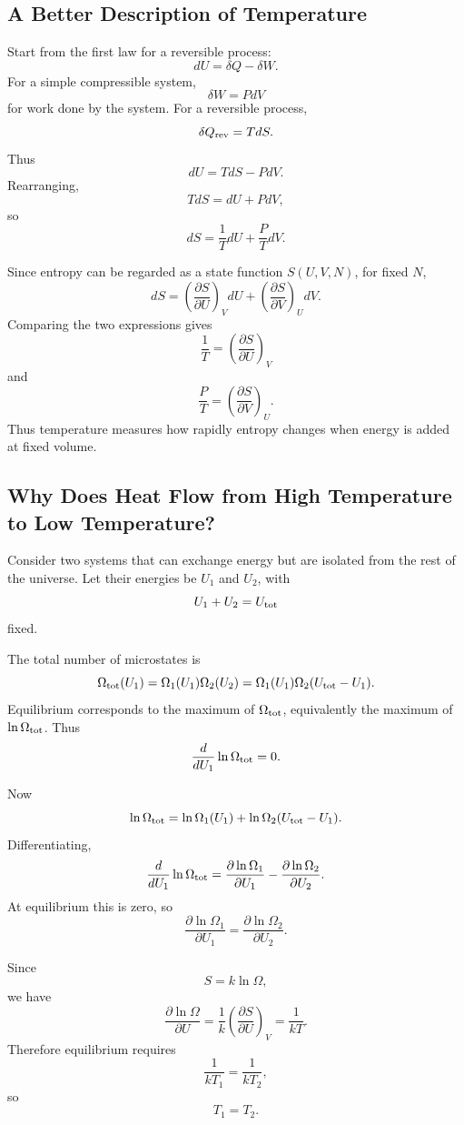 \documentclass{report}
\numberwithin{equation}{section}
\begin{document}
\subsection{A Better Description of Temperature}

Start from the first law for a reversible process:
\[
dU=\delta Q-\delta W.
\]
For a simple compressible system,
\[
\delta W=PdV
\]
for work done by the system. For a reversible process,
\[
\delta Q_{\rm rev}=TdS.
\]
Thus
\[
dU=TdS-PdV.
\]
Rearranging,
\[
TdS=dU+PdV,
\]
so
\[
dS=\frac{1}{T}dU+\frac{P}{T}dV.
\]

Since entropy can be regarded as a state function \(S(U,V,N)\), for fixed \(N\),
\[
dS=
\left(\frac{\partial S}{\partial U}\right)_V dU
+
\left(\frac{\partial S}{\partial V}\right)_U dV.
\]
Comparing the two expressions gives
\[
\boxed{
\frac{1}{T}
=
\left(\frac{\partial S}{\partial U}\right)_V
}
\]
and
\[
\boxed{
\frac{P}{T}
=
\left(\frac{\partial S}{\partial V}\right)_U.
}
\]
Thus temperature measures how rapidly entropy changes when energy is added at fixed volume.

\subsection{Why Does Heat Flow from High Temperature to Low Temperature?}

Consider two systems that can exchange energy but are isolated from the rest of the universe. Let their energies be \(U_1\) and \(U_2\), with
\[
U_1+U_2=U_{\rm tot}
\]
fixed.

The total number of microstates is
\[
\Omega_{\rm tot}(U_1)
=
\Omega_1(U_1)\Omega_2(U_2)
=
\Omega_1(U_1)\Omega_2(U_{\rm tot}-U_1).
\]
Equilibrium corresponds to the maximum of \(\Omega_{\rm tot}\), equivalently the maximum of \(\ln\Omega_{\rm tot}\). Thus
\[
\frac{d}{dU_1}\ln\Omega_{\rm tot}=0.
\]

Now
\[
\ln\Omega_{\rm tot}
=
\ln\Omega_1(U_1)
+
\ln\Omega_2(U_{\rm tot}-U_1).
\]
Differentiating,
\[
\frac{d}{dU_1}\ln\Omega_{\rm tot}
=
\frac{\partial \ln\Omega_1}{\partial U_1}
-
\frac{\partial \ln\Omega_2}{\partial U_2}.
\]
At equilibrium this is zero, so
\[
\frac{\partial \ln\Omega_1}{\partial U_1}
=
\frac{\partial \ln\Omega_2}{\partial U_2}.
\]

Since
\[
S=k\ln\Omega,
\]
we have
\[
\frac{\partial \ln\Omega}{\partial U}
=
\frac{1}{k}
\left(\frac{\partial S}{\partial U}\right)_V
=
\frac{1}{kT}.
\]
Therefore equilibrium requires
\[
\frac{1}{kT_1}=\frac{1}{kT_2},
\]
so
\[
T_1=T_2.
\]
\end{document}

